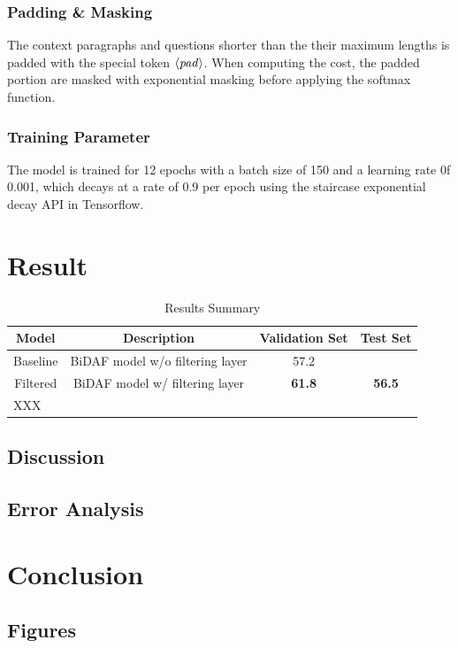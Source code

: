 \documentclass{article} %
\begin{document}
\subsubsection{Padding \& Masking}
The context paragraphs and questions shorter than the their maximum lengths is padded with the special token $\it{\langle pad \rangle}$. When computing the cost, the padded portion are masked with exponential masking before applying the softmax function.
\subsubsection{Training Parameter}
The model is trained for 12 epochs with a batch size of 150 and a learning rate 0f 0.001, which decays at a rate of 0.9 per epoch using the staircase exponential decay API in Tensorflow. 
\section{Result}
\begin{table}[t]
\caption{Results Summary}
\begin{center}
\begin{tabular}{ |c||c|c|c|  }
 \hline
 \bf Model & \bf Description & \bf Validation Set & \bf Test Set\\
 \hline
  Baseline   & BiDAF model w/o filtering layer    &57.2&  \\
  Filtered   & BiDAF model w/ filtering layer    & \bf 61.8&  \bf 56.5 \\
    \hline
    \multicolumn{1}{l}{XXX}
\end{tabular}
\end{center}
\end{table}
\subsection{Discussion}
\subsection{Error Analysis}

\section{Conclusion}

\subsection{Figures}
\end{document}
